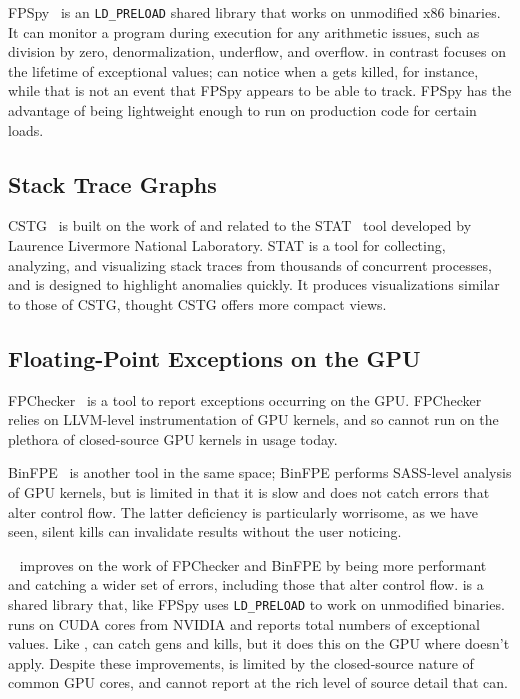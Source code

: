 \documentclass{juliacon}
\begin{document}
FPSpy~\cite{dindaSpyingFloatingPoint2020} is an \texttt{LD\_PRELOAD} shared library that works on unmodified x86 binaries.
It can monitor a program during execution for any \fp{} arithmetic issues, such as division by zero, denormalization, underflow, and overflow.
\FT{} in contrast focuses on the lifetime of exceptional values; \FT{} can notice when a \NaN{} gets killed, for instance, while that is not an event that FPSpy appears to be able to track.
FPSpy has the advantage of being lightweight enough to run on production code for certain loads.

\subsection{Stack Trace Graphs}

CSTG~\cite{humphreySystematicDebuggingMethods2014} is built on the work of and related to the STAT~\cite{arnoldStackTraceAnalysis2007} tool developed by Laurence Livermore National Laboratory.
STAT is a tool for collecting, analyzing, and visualizing stack traces from thousands of concurrent processes, and is designed to highlight anomalies quickly.
It produces visualizations similar to those of CSTG, thought CSTG offers more compact views.

\subsection{Floating-Point Exceptions on the GPU}

FPChecker~\cite{l-ase-2019} is a tool to report \fp{} exceptions occurring on the GPU.
FPChecker relies on LLVM-level instrumentation of GPU kernels, and so cannot run on the plethora of closed-source GPU kernels in usage today.

BinFPE~\cite{llg-soap-2022} is another tool in the same space;
BinFPE performs SASS-level analysis of GPU kernels, but is limited in that it is slow and does not catch errors that alter control flow.
The latter deficiency is particularly worrisome, as we have seen, silent \NaN{} kills can invalidate results without the user noticing.

\GPUFPX{}~\cite{llsflg-hpdc-2023} improves on the work of FPChecker and BinFPE by being more performant and catching a wider set of errors, including those that alter control flow.
\GPUFPX{} is a shared library that, like FPSpy uses \texttt{LD\_PRELOAD} to work on unmodified binaries.
\GPUFPX{} runs on CUDA cores from NVIDIA and reports total numbers of exceptional values.
Like \FT{}, \GPUFPX{} can catch \NaN{} gens and kills, but it does this on the GPU where \FT{} doesn't apply.
Despite these improvements, \GPUFPX{} is limited by the closed-source nature of common GPU cores, and cannot report at the rich level of source detail that \FT{} can.
\end{document}
